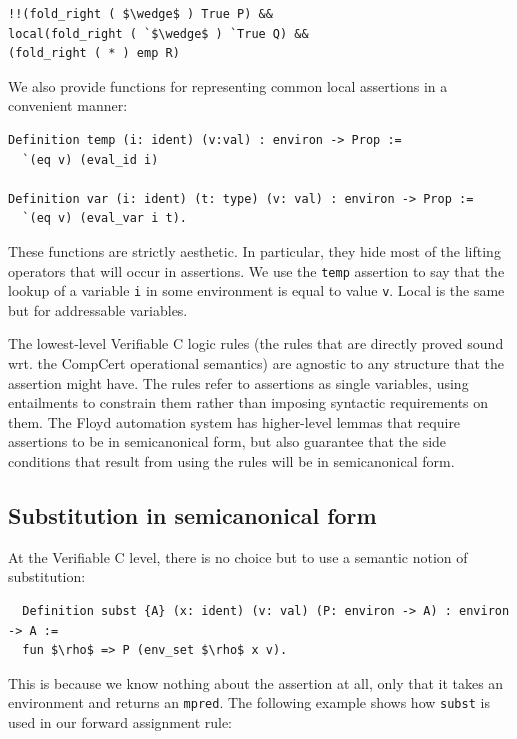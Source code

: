 \documentclass{puthesis}
\begin{document}
\begin{lstlisting}
!!(fold_right ( $\wedge$ ) True P) &&
local(fold_right ( `$\wedge$ ) `True Q) &&
(fold_right ( * ) emp R)
\end{lstlisting}

We also provide functions for representing common local assertions in
a convenient manner:

\begin{lstlisting}
Definition temp (i: ident) (v:val) : environ -> Prop :=
  `(eq v) (eval_id i)

Definition var (i: ident) (t: type) (v: val) : environ -> Prop :=
  `(eq v) (eval_var i t).
\end{lstlisting}

These functions are strictly aesthetic. In particular, they hide most
of the lifting operators that will occur in assertions. We use the
\lstinline|temp| assertion to say that the lookup of a variable
\lstinline|i| in some environment is equal to value
\lstinline|v|. Local is the same but for addressable variables.

The lowest-level Verifiable C logic rules (the rules that are directly
proved sound wrt. the CompCert operational semantics) are agnostic to any
structure that the assertion might have. The rules refer to
assertions as single variables, using entailments to constrain them
rather than imposing syntactic requirements on them. The Floyd
automation system has higher-level lemmas that require assertions
to be in semicanonical form, but also guarantee that the side
conditions that result from using the rules will be in semicanonical
form.

\subsection{Substitution in semicanonical form}

At the Verifiable C level, there is no choice but to use a semantic
notion of substitution:

\begin{lstlisting}
  Definition subst {A} (x: ident) (v: val) (P: environ -> A) : environ -> A :=
  fun $\rho$ => P (env_set $\rho$ x v).
\end{lstlisting}

This is because we know nothing about the assertion at all, only that
it takes an environment and returns an \lstinline|mpred|. The following example
shows how \lstinline|subst| is used in our forward assignment rule:
\end{document}
